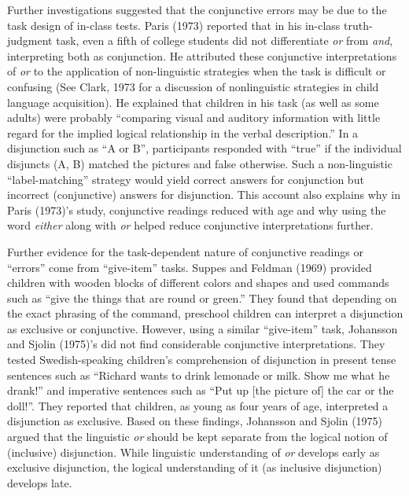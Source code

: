 \documentclass[,man,floatsintext]{apa6}
\begin{document}
Further investigations suggested that the conjunctive errors may be due to the task design of in-class tests. Paris (1973) reported that in his in-class truth-judgment task, even a fifth of college students did not differentiate \emph{or} from \emph{and}, interpreting both as conjunction. He attributed these conjunctive interpretations of \emph{or} to the application of non-linguistic strategies when the task is difficult or confusing (See Clark, 1973 for a discussion of nonlinguistic strategies in child language acquisition). He explained that children in his task (as well as some adults) were probably \enquote{comparing visual and auditory information with little regard for the implied logical relationship in the verbal description.} In a disjunction such as \enquote{A or B}, participants responded with \enquote{true} if the individual disjuncts (A, B) matched the pictures and false otherwise. Such a non-linguistic \enquote{label-matching} strategy would yield correct answers for conjunction but incorrect (conjunctive) answers for disjunction. This account also explains why in Paris (1973)'s study, conjunctive readings reduced with age and why using the word \emph{either} along with \emph{or} helped reduce conjunctive interpretations further.

Further evidence for the task-dependent nature of conjunctive readings or \enquote{errors} come from \enquote{give-item} tasks. Suppes and Feldman (1969) provided children with wooden blocks of different colors and shapes and used commands such as \enquote{give the things that are round or green.} They found that depending on the exact phrasing of the command, preschool children can interpret a disjunction as exclusive or conjunctive. However, using a similar \enquote{give-item} task, Johansson and Sjolin (1975)'s did not find considerable conjunctive interpretations. They tested Swedish-speaking children's comprehension of disjunction in present tense sentences such as \enquote{Richard wants to drink lemonade or milk. Show me what he drank!} and imperative sentences such as \enquote{Put up {[}the picture of{]} the car or the doll!}. They reported that children, as young as four years of age, interpreted a disjunction as exclusive. Based on these findings, Johansson and Sjolin (1975) argued that the linguistic \emph{or} should be kept separate from the logical notion of (inclusive) disjunction. While linguistic understanding of \emph{or} develops early as exclusive disjunction, the logical understanding of it (as inclusive disjunction) develops late.
\end{document}
